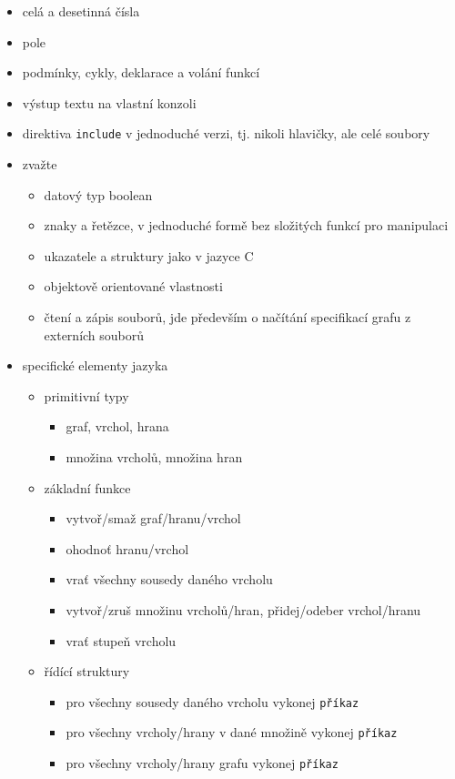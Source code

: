 \documentclass[11pt,twoside,a4paper]{book}
\begin{document}
\begin{itemize}
\item celá a desetinná čísla
\item pole
\item podmínky, cykly, deklarace a volání funkcí
\item výstup textu na vlastní konzoli
\item direktiva \texttt{include} v jednoduché verzi, tj. nikoli hlavičky, ale celé soubory

\item zvažte
	\begin{itemize}
	\item datový typ boolean
	\item znaky a řetězce, v jednoduché formě bez složitých funkcí pro manipulaci
	\item ukazatele a struktury jako v jazyce C
	\item objektově orientované vlastnosti
	\item čtení a zápis souborů, jde především o načítání specifikací grafu z externích souborů
	\end{itemize}

\item specifické elementy jazyka
	\begin{itemize}
	\item primitivní typy
		\begin{itemize}
		\item graf, vrchol, hrana
		\item množina vrcholů, množina hran
		\end{itemize}
	\item základní funkce
		\begin{itemize}
		\item vytvoř/smaž graf/hranu/vrchol
		\item ohodnoť hranu/vrchol
		\item vrať všechny sousedy daného vrcholu
		\item vytvoř/zruš množinu vrcholů/hran, přidej/odeber vrchol/hranu
		\item vrať stupeň vrcholu
		\end{itemize}
	\item řídící struktury
		\begin{itemize}
		\item pro všechny sousedy daného vrcholu vykonej \texttt{příkaz}
		\item pro všechny vrcholy/hrany v dané množině vykonej \texttt{příkaz}
		\item pro všechny vrcholy/hrany grafu vykonej \texttt{příkaz}
		\end{itemize}
	\end{itemize}
\end{itemize}
\end{document}
